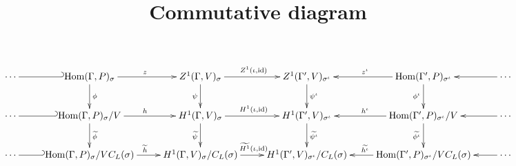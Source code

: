 \documentclass[12pt, a4paper]{amsart}
\newcommand{\Hom}[3]{\mathrm{Hom}(#1, #2)_{#3}}
\begin{document}
\title{Commutative diagram}
\maketitle
\begin{displaymath}
\xymatrix{
\cdots & \ar@{_{(}-}[l] \Hom{\Gamma}{P}{\sigma} \ar[d]^{\phi} \ar[r]^z & Z^1(\Gamma, V)_\sigma \ar[d]_{\psi} \ar[r]^{Z^1(\iota, \mathrm{id})} & Z^1(\Gamma', V)_{\sigma^\iota} \ar[d]^{\psi^\iota} & \Hom{\Gamma'}{P}{\sigma^\iota} \ar[l]_{z^\iota} \ar[d]_{\phi^\iota} & \cdots \ar@{->}[l] \\
\cdots & \ar@{_{(}-}[l] \Hom{\Gamma}{P}{\sigma}/V \ar[d]^{\widetilde{\phi}} \ar[r]^h & H^1(\Gamma, V)_\sigma \ar[d]_{\widetilde{\psi}} \ar[r]^{H^1(\iota, \mathrm{id})} & H^1(\Gamma', V)_{\sigma^\iota} \ar[d]^{\widetilde{\psi^\iota}} & \Hom{\Gamma'}{P}{\sigma^\iota}/V \ar[l]_{h^\iota} \ar[d]_{\widetilde{\phi^\iota}} & \cdots \ar@{->}[l] \\
\cdots & \ar@{_{(}-}[l] \Hom{\Gamma}{P}{\sigma}/VC_L(\sigma) \ar[r]^{\widetilde{h}} & H^1(\Gamma, V)_\sigma/C_L(\sigma) \ar[r]^{\widetilde{H^1}(\iota, \mathrm{id})} & H^1(\Gamma', V)_{\sigma^\iota}/C_L(\sigma) & \Hom{\Gamma'}{P}{\sigma^\iota}/VC_L(\sigma) \ar[l]_{\widetilde{h^\iota}} & \cdots \ar@{->}[l] \\
}
\end{displaymath}
\end{document}
